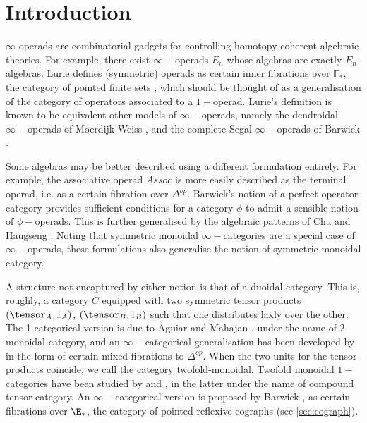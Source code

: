 \section{Introduction}
$\infty$-operads are combinatorial gadgets for controlling homotopy-coherent algebraic theories. For example, there exist $\infty-$operads $E_n$ whose algebras are exactly $E_n$-algebras. Lurie defines (symmetric) operads as certain inner fibrations over $\mathbb{F}_*$, the category of pointed finite sets \cite{HA}, which should be thought of as a generalisation of the category of operators associated to a $1-$operad. Lurie's definition is known to be equivalent other models of $\infty-$operads, namely the dendroidal $\infty-$operads of Moerdijk-Weiss \cite{Moerdijk-Weiss} \cite{Heuts-Hinich-Moerdijk} \cite{Hinich-Moerdijk}, and the complete Segal $\infty-$operads of Barwick \cite{Bar18} \cite{Chu-Haugseng-Heuts}.

Some algebras may be better described using a different formulation entirely. For example, the associative operad $Assoc$ is more easily described as the terminal  operad, i.e. as a certain fibration over $\Delta^{op}$. Barwick's notion of a perfect operator category \cite{Bar18} provides sufficient conditions for a category $\phi$ to admit a sensible notion of $\phi-$operads. This is further generalised by the algebraic patterns of Chu and Haugseng \cite{ChuHaugseng}. Noting that symmetric monoidal $\infty-$categories are a special case of $\infty-$operads, these formulations also generalise the notion of symmetric monoidal category.

A structure not encaptured by either notion is that of a duoidal category. This is, roughly, a category $C$ equipped with two symmetric tensor products $(\tensor_A,1_A)$, $(\tensor_B,1_B)$ such that one distributes laxly over the other. The 1-categorical version is due to Aguiar and Mahajan \cite{Aguiar-Mahajan}, under the name of 2-monoidal category, and an $\infty-$categorical generalisation has been developed by \cite{Torii24} in the form of certain mixed fibrations to $\Delta^{op}.$ When the two units for the tensor products coincide, we call the category twofold-monoidal. Twofold monoidal $1-$categories have been studied by \cite{Balteanu-Fiedorowicz-Schwaenzl-Vogt} and \cite{BeilinsonDrinfeld}, in the latter under the name of compound tensor category. An $\infty-$categorical version is proposed by Barwick \cite{Bar24}, as certain fibrations over $\E_*$, the category of pointed reflexive cographs (see \cref{sec:cograph}).

